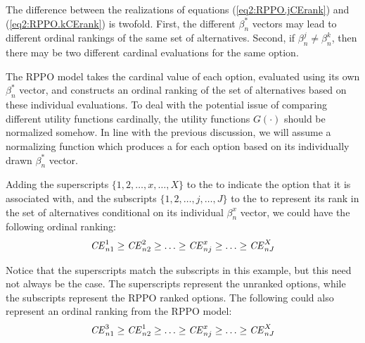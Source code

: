 \documentclass[../main.tex]{subfiles}
\begin{document}
The difference between the realizations of equations (\ref{eq2:RPPO.jCErank}) and (\ref{eq2:RPPO.kCErank}) is twofold.
First, the different $\beta_n^*$ vectors may lead to different ordinal rankings of the same set of alternatives.
Second, if $\beta_n^j \neq \beta_n^k$, then there may be two different cardinal evaluations for the same option.

The RPPO model takes the cardinal value of each option, evaluated using its own $\beta_n^*$  vector, and constructs an ordinal ranking of the set of alternatives based on these individual evaluations.
To deal with the potential issue of comparing different utility functions cardinally, the utility functions $G(\cdot)$ should be normalized somehow.{\footnotemark}
In line with the previous discussion, we will assume a normalizing function which produces a {\CE} for each option based on its individually drawn $\beta_n^*$ vector.

\addtocounter{footnote}{-1}

Adding the superscripts $\{1,2,\ldots,x,\ldots,X\}$  to the {\CE} to indicate the option that it is associated with, and the subscripts $\{1,2,\ldots,j,\ldots,J\}$ to the {\CE} to represent its rank in the set of alternatives conditional on its individual $\beta_n^x$ vector, we could have the following ordinal ranking:
\begin{equation}
	\label{eq2:RPPO.CErank.f}
	{\ensuremath{\mathit{CE}}}^1_{n1} \geq {\ensuremath{\mathit{CE}}}^2_{n2} \geq \ldots \geq {\ensuremath{\mathit{CE}}}^x_{nj} \geq \ldots \geq {\ensuremath{\mathit{CE}}}^X_{nJ}
\end{equation}

Notice that the superscripts match the subscripts in this example, but this need not always be the case.
The superscripts represent the unranked options, while the subscripts represent the RPPO ranked options.
The following could also represent an ordinal ranking from the RPPO model:
\begin{equation}
	\label{eq2:RPPO.CErank.a}
	{\ensuremath{\mathit{CE}}}^3_{n1} \geq {\ensuremath{\mathit{CE}}}^1_{n2} \geq \ldots \geq {\ensuremath{\mathit{CE}}}^x_{nj} \geq \ldots \geq {\ensuremath{\mathit{CE}}}^X_{nJ}
\end{equation}
\end{document}
